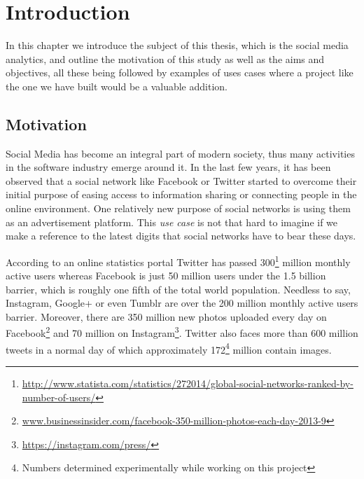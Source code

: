 \chapter{Introduction}
\label{chapter:intro}

In this chapter we introduce the subject of this thesis, which is the social media
analytics, and outline the motivation of this study as well as the aims and
objectives, all these being followed by examples of uses cases where a project
like the one we have built would be a valuable addition.

\section{Motivation}
\label{sec:proj-motivation}

Social Media has become an integral part of modern society, thus many
activities in the software industry emerge around it. In the last few years,
it has been observed that a social network like
Facebook or Twitter started to overcome their initial
purpose of easing access to information sharing or connecting people in the
online environment. One relatively new purpose of social networks is using
them as an advertisement platform. This \textit{use case} is not that hard to
imagine if we make a reference to the latest digits that social networks have
to bear these days.

According to an online statistics portal\cite{statista} Twitter has passed 300\footnote{\url{http://www.statista.com/statistics/272014/global-social-networks-ranked-by-number-of-users/}}
million monthly active users whereas Facebook is just 50 million users under
the 1.5 billion barrier, which is roughly one fifth of the total world population.
Needless to say, Instagram, Google+ or even Tumblr are over the 200
million monthly active users barrier. Moreover, there are 350 million new
photos uploaded every day on Facebook\footnote{\url{www.businessinsider.com/facebook-350-million-photos-each-day-2013-9}}
and 70 million on Instagram\footnote{\url{https://instagram.com/press/}}.
Twitter also faces more than 600 million tweets in a normal day of which
approximately 172\footnote{Numbers determined
experimentally while working on this project} million contain images.

